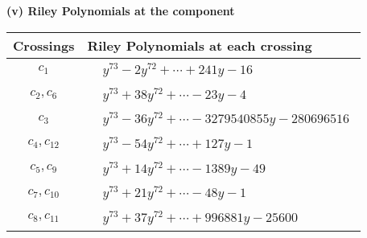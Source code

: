 \documentclass[1p]{elsarticle_modified}
\theoremstyle{definition}
\begin{document}
\flushleft \textbf{(v) Riley Polynomials at the component}\newline \\
\begin{tabular}{m{50pt}|m{274pt}}
Crossings & \hspace{64pt}Riley Polynomials at each crossing \\
\hline $$\begin{aligned}c_{1}\end{aligned}$$&$\begin{aligned}
&y^{73}-2 y^{72}+\cdots+241 y-16
\end{aligned}$\\
\hline $$\begin{aligned}c_{2},c_{6}\end{aligned}$$&$\begin{aligned}
&y^{73}+38 y^{72}+\cdots-23 y-4
\end{aligned}$\\
\hline $$\begin{aligned}c_{3}\end{aligned}$$&$\begin{aligned}
&y^{73}-36 y^{72}+\cdots-3279540855 y-280696516
\end{aligned}$\\
\hline $$\begin{aligned}c_{4},c_{12}\end{aligned}$$&$\begin{aligned}
&y^{73}-54 y^{72}+\cdots+127 y-1
\end{aligned}$\\
\hline $$\begin{aligned}c_{5},c_{9}\end{aligned}$$&$\begin{aligned}
&y^{73}+14 y^{72}+\cdots-1389 y-49
\end{aligned}$\\
\hline $$\begin{aligned}c_{7},c_{10}\end{aligned}$$&$\begin{aligned}
&y^{73}+21 y^{72}+\cdots-48 y-1
\end{aligned}$\\
\hline $$\begin{aligned}c_{8},c_{11}\end{aligned}$$&$\begin{aligned}
&y^{73}+37 y^{72}+\cdots+996881 y-25600
\end{aligned}$\\
\hline
\end{tabular}\\~\\
\end{document}
